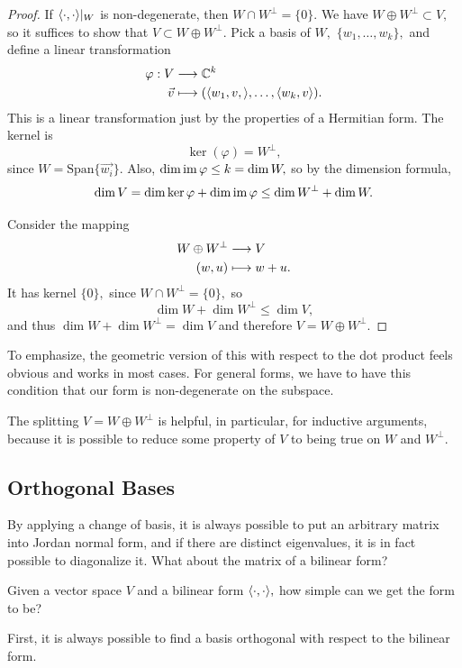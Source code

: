\begin{proof}
If $\langle \cdot, \cdot \rangle|_W$ is non-degenerate, then $W \cap W^\perp = \{0\}.$ We have $W \oplus W^\perp \subset V,$
so it suffices to show that $V \subset W \oplus W^\perp.$ Pick a basis of $W,$ $\{w_1, \ldots, w_k\},$ and define a linear transformation 
\begin{align*}
    \varphi: V &\longrightarrow \mathbb C^k \\
    \vec{v} &\longmapsto (\langle w_1, v, \rangle, \ldots, \langle w_k, v \rangle).
\end{align*}
This is a linear transformation just by the properties of a Hermitian form.
The kernel is \[
\ker(\varphi) = W^\perp,
\]
since $W = \text{Span}\{\vec{w_i}\}.$ Also, $\dim \operatorname{im} \varphi \leq k = \dim W,$ so by the dimension formula,
\[
\dim V = \dim \ker\varphi + \dim \operatorname{im} \varphi \leq \dim W^\perp + \dim W.
\]

Consider the mapping
\begin{align*}
    W \oplus W^\perp &\longrightarrow V \\
    (w, u) &\longmapsto w + u.
\end{align*}
It has kernel $\{0\},$ since $W \cap W^\perp = \{0\},$ so 
\[
\dim W + \dim W^\perp \leq \dim V,
\]
and thus $\dim W + \dim W^\perp = \dim V$ and therefore $V = W \oplus W^\perp.$
\end{proof}

To emphasize, the geometric version of this with respect to the dot product feels obvious and works in most cases. For general forms, we have to have this condition that our form is non-degenerate on the subspace.

The splitting $V = W \oplus W^\perp$ is helpful, in particular, for inductive arguments, because it is possible to reduce some property of $V$ to being true on $W$ and $W^\perp.$

\subsection{Orthogonal Bases}

By applying a change of basis, it is always possible to put an arbitrary matrix into Jordan normal form, and if there are distinct eigenvalues, it is in fact possible to diagonalize it. What about the matrix of a bilinear form?
\begin{qq}
Given a vector space $V$ and a bilinear form $\langle \cdot, \cdot \rangle,$ how simple can we get the form to be?
\end{qq}

First, it is always possible to find a basis orthogonal with respect to the bilinear form. 

